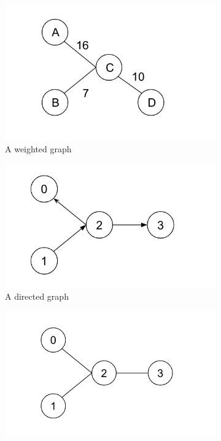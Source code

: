 \documentclass[12pt,a4paper]{report}
\begin{document}
\begin{figure}[ht]
    \centering
    \begin{subfigure}[ht]{0.33\textwidth}
        \centering
        \includegraphics[width=\textwidth]{plan_images/weighted.png}
        \caption{A weighted graph}
        \label{fig:weighted}
    \end{subfigure}
    \hfill
    \begin{subfigure}[ht]{0.32\textwidth}
        \centering
        \includegraphics[width=\textwidth]{plan_images/directed.png}
        \caption{A directed graph}
        \label{fig:directed}
    \end{subfigure}
    \hfill
    \begin{subfigure}[ht]{0.32\textwidth}
        \centering
        \includegraphics[width=\textwidth]{plan_images/undirected.png}

\end{subfigure}
\end{figure}
\end{document}
